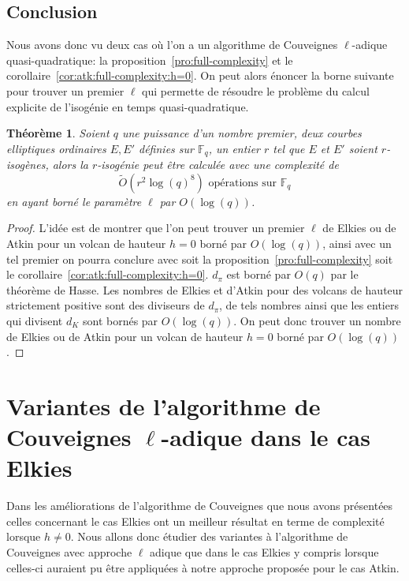 \documentclass[10pt,a4paper]{book}
\theoremstyle{plain}
\newtheorem{thm}{Théorème}[chapter]
\theoremstyle{definition}
\theoremstyle{definition}
\theoremstyle{definition}
\theoremstyle{definition}
\theoremstyle{definition}
\theoremstyle{remark}
\theoremstyle{remark}
\theoremstyle{definition}
\begin{document}

\section{Conclusion}

Nous avons donc vu deux cas où l'on a un algorithme de Couveignes 
$\ell$-adique quasi-quadratique: la proposition~\ref{pro:full-complexity} et le
corollaire~\ref{cor:atk:full-complexity:h=0}. On peut alors énoncer la borne 
suivante pour trouver un premier $\ell$ qui permette de résoudre le problème du
calcul explicite de l'isogénie en temps quasi-quadratique.

\begin{thm}
Soient $q$ une puissance d'un nombre premier, deux courbes elliptiques 
ordinaires $E,E'$ définies sur $\mathbb{F}_q$, un entier $r$ tel que $E$ et 
$E'$ soient $r$-isogènes, alors la $r$-isogénie peut être calculée avec une 
complexité de
\[
\tilde{O}(r^2 \log(q)^{8}) \text{ opérations sur }\mathbb{F}_q
\]
en ayant borné le paramètre $\ell$ par $O(\log(q))$.
\end{thm}

\begin{proof}
L'idée est de montrer que l'on peut trouver un premier $\ell$ de
Elkies ou de Atkin pour un volcan de hauteur $h=0$ borné par $O(\log(q))$, 
ainsi avec un tel premier on pourra conclure avec soit la 
proposition~\ref{pro:full-complexity} soit le 
corollaire~\ref{cor:atk:full-complexity:h=0}. 
$d_{\pi}$ est borné par $O(q)$ par le théorème de Hasse. Les nombres de Elkies 
et d'Atkin pour des volcans de hauteur strictement positive sont des diviseurs
de $d_{\pi}$, de tels nombres ainsi que les entiers qui divisent $d_{K}$
sont bornés par $O(\log(q))$. On peut donc trouver un nombre de Elkies ou de 
Atkin pour un volcan de hauteur $h=0$ borné par $O(\log(q))$.
\end{proof}

\chapter{Variantes de l'algorithme de Couveignes $\ell$-adique dans le cas Elkies}
\label{cha:var:cou}
Dans les améliorations de l'algorithme de Couveignes que nous avons présentées 
celles concernant le cas Elkies ont un meilleur résultat en terme de complexité
lorsque $h \neq 0$. 
Nous allons donc étudier des variantes à l'algorithme de Couveignes avec 
approche $\ell$ adique que dans le cas Elkies y compris lorsque celles-ci
auraient pu être appliquées à notre approche proposée pour le cas Atkin.
\end{document}
